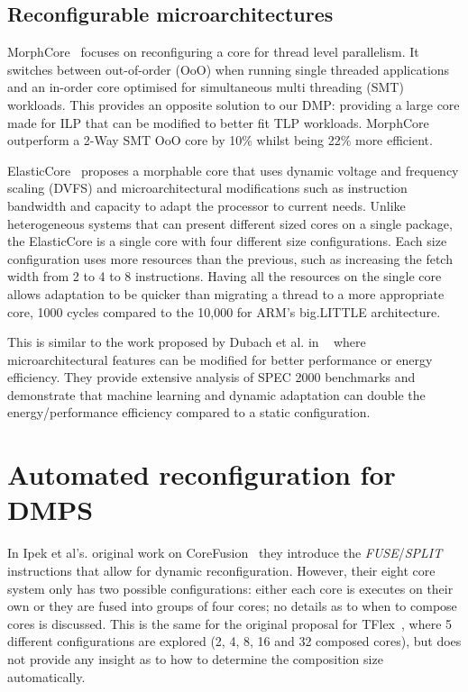 \subsection{Reconfigurable microarchitectures}

MorphCore~\cite{khubaibMorphCore2012} focuses on reconfiguring a core for thread level parallelism.
It switches between out-of-order (OoO) when running single threaded applications and an in-order core optimised for simultaneous multi threading (SMT) workloads.
This provides an opposite solution to our DMP: providing a large core made for ILP that can be modified to better fit TLP workloads.
MorphCore outperform a 2-Way SMT OoO core by 10\% whilst being 22\% more efficient.

ElasticCore~\cite{tavanaElastic} proposes a morphable core that uses dynamic voltage and frequency scaling (DVFS) and microarchitectural modifications such as instruction bandwidth and capacity to adapt the processor to current needs.
Unlike heterogeneous systems that can present different sized cores on a single package, the ElasticCore is a single core with four different size configurations.
Each size configuration uses more resources than the previous, such as increasing the fetch width from 2 to 4 to 8 instructions.
Having all the resources on the single core allows adaptation to be quicker than migrating a thread to a  more appropriate core, 1000 cycles compared to the 10,000 for ARM's big.LITTLE architecture.

This is similar to the work proposed by Dubach et al. in ~\cite{dubach13dynamic} where microarchitectural features can be modified for better performance or energy efficiency.
They provide extensive analysis of SPEC 2000 benchmarks and demonstrate that machine learning and dynamic adaptation can double the energy/performance efficiency compared to a static configuration.


\section{Automated reconfiguration for DMPS}

In Ipek et al's. original work on CoreFusion~\cite{ipek2007CoreFusion} they introduce the \textit{FUSE}/\textit{SPLIT} instructions that allow for dynamic reconfiguration.
However, their eight core system only has two possible configurations: either each core is executes on their own or they are fused into groups of four cores; no details as to when to compose cores is discussed.
This is the same for the original proposal for TFlex~\cite{kim2007tflex}, where 5 different configurations are explored (2, 4, 8, 16 and 32 composed cores), but does not provide any insight as to how to determine the composition size automatically.

